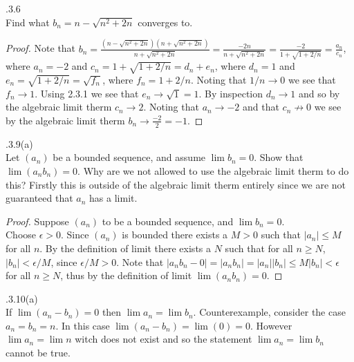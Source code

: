 \documentclass[12pt]{article}
\makeatletter
\theoremstyle{homework}
\newenvironment{exercise}[1]
{\def\@currentlabel{#1}\exercisecore}
{\endexercisecore}
\makeatother
\begin{document}
\begin{exercise}

2.3.6\\
Find what $b_n=n-\sqrt{n^2+2n}$ converges to.
\end{exercise}
\begin{proof}
Note that $b_n=\frac{(n-\sqrt{n^2+2n})(n+\sqrt{n^2+2n})}{n+\sqrt{n^2+2n}}=\frac{-2n}{n+\sqrt{n^2+2n}}=\frac{-2}{1+\sqrt{1+2/n}}=\frac{a_n}{c_n}$, where $a_n=-2$ and $c_n=1+\sqrt{1+2/n}=d_n+e_n$, where $d_n=1$ and $e_n=\sqrt{1+2/n}=\sqrt{f_n}$, where $f_n=1+2/n$.  Noting that $1/n\rightarrow 0$ we see that $f_n\rightarrow 1$.  Using 2.3.1 we see that $e_n\rightarrow \sqrt{1}=1$.  By inspection $d_n\rightarrow 1$ and so by the algebraic limit therm $c_n\rightarrow 2$.  Noting that $a_n\rightarrow -2$ and that $c_n\not\rightarrow 0$ we see by the algebraic limit therm $b_n\rightarrow \frac{-2}{2}=-1$.
\end{proof}

\begin{exercise}

2.3.9(a)\\
Let $(a_n)$ be a bounded sequence, and assume $\lim b_n=0$.  Show that $\lim (a_nb_n)=0$.  Why are we not allowed to use the algebraic limit therm to do this?
\end{exercise}
Firstly this is outside of the algebraic limit therm entirely since we are not guaranteed that $a_n$ has a limit.

\begin{proof}
Suppose $(a_n)$ to be a bounded sequence, and $\lim b_n=0$.\\
Choose $\epsilon>0$.  Since $(a_n)$ is bounded there exists a $M>0$ such that $|a_n|\leq M$ for all $n$.  By the definition of limit there exists a $N$ such that for all $n\geq N$, $|b_n|<\epsilon/M$, since $\epsilon/M>0$.  Note that $|a_nb_n-0|=|a_nb_n|=|a_n||b_n|\leq M|b_n|<\epsilon$ for all $n\geq N$, thus by the definition of limit $\lim (a_nb_n)=0$.
\end{proof}

\begin{exercise}

2.3.10(a)\\
If $\lim(a_n-b_n)=0$ then $\lim a_n=\lim b_n$.
\end{exercise}
Counterexample, consider the case $a_n=b_n=n$.  In this case $\lim(a_n-b_n)=\lim (0)=0$.  However $\lim a_n=\lim n$ witch does not exist and so the statement $\lim a_n=\lim b_n$ cannot be true.
\end{document}
